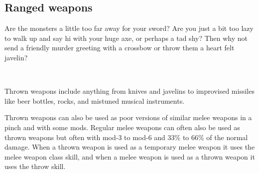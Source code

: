 \subsection*{Ranged weapons}

Are the monsters a little too far away for your sword? Are you just a bit too lazy to walk up and say hi with your huge axe, or perhaps a tad shy? Then why not send a friendly murder greeting with a crossbow or throw them a heart felt javelin?

\

Thrown weapons include anything from knives and javelins to improvised missiles like beer bottles, rocks, and mistuned musical instruments.

Thrown weapons can also be used as poor versions of similar melee weapons in a pinch and with some mods. Regular melee weapons can often also be used as thrown weapons but often with mod-3 to mod-6 and 33\% to 66\% of the normal damage. When a thrown weapon is used as a temporary melee weapon it uses the melee weapon class skill, and when a melee weapon is used as a thrown weapon it uses the throw skill.

